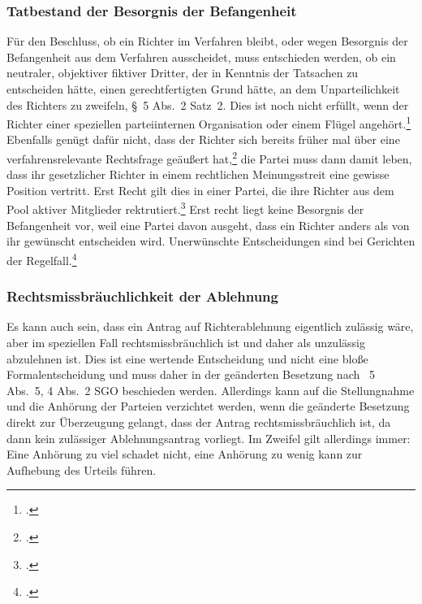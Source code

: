 \subsubsection{Tatbestand der Besorgnis der Befangenheit}
\label{Zusammensetzung:Spruchkoerper:Befangenheitsbesorgnis:Tatbestand}
Für den Beschluss, ob ein Richter im Verfahren bleibt, oder wegen Besorgnis der Befangenheit aus dem Verfahren ausscheidet, muss entschieden werden, ob ein neutraler, objektiver fiktiver Dritter, der in Kenntnis der Tatsachen zu entscheiden hätte, einen gerechtfertigten Grund hätte, an dem Unparteilichkeit des Richters zu zweifeln, \S~5 Abs.~2 Satz~2.
Dies ist noch nicht erfüllt, wenn der Richter einer speziellen parteiinternen Organisation oder einem Flügel angehört.\footnote{\cite[S.~6]{BSG115HSBefangeheitIII}.}
Ebenfalls genügt dafür nicht, dass der Richter sich bereits früher mal über eine verfahrensrelevante Rechtsfrage geäußert hat,\footnote{\cite{BGHXIZR38801}.} die Partei muss dann damit leben, dass ihr gesetzlicher Richter in einem rechtlichen Meinungsstreit eine gewisse Position vertritt.
Erst Recht gilt dies in einer Partei, die ihre Richter aus dem Pool aktiver Mitglieder rektrutiert.\footnote{\cites[Lenski][\S~14 Rn~15]{lenski2011parteiengesetz}.}
Erst recht liegt keine Besorgnis der Befangenheit vor, weil eine Partei davon ausgeht, dass ein Richter anders als von ihr gewünscht entscheiden wird. Unerwünschte Entscheidungen sind bei Gerichten der Regelfall.\footnote{\cites[S.~2]{BSG201305062BefangenheitI}.}

\subsubsection{Rechtsmissbräuchlichkeit der Ablehnung}
\label{Zusammensetzung:Spruchkoerper:Befangenheitsbesorgnis:Rechtsmissbrauch}
Es kann auch sein, dass ein Antrag auf Richterablehnung eigentlich zulässig wäre, aber im speziellen Fall rechtsmissbräuchlich ist und daher als unzulässig abzulehnen ist.
Dies ist eine wertende Entscheidung und nicht eine bloße Formalentscheidung und muss daher in der geänderten Besetzung nach \SSS~5 Abs.~5, 4 Abs.~2 SGO beschieden werden.
Allerdings kann auf die Stellungnahme und die Anhörung der Parteien verzichtet werden, wenn die geänderte Besetzung direkt zur Überzeugung gelangt, dass der Antrag rechtsmissbräuchlich ist, da dann kein zulässiger Ablehnungsantrag vorliegt.
Im Zweifel gilt allerdings immer: Eine Anhörung zu viel schadet nicht, eine Anhörung zu wenig kann zur Aufhebung des Urteils führen.

